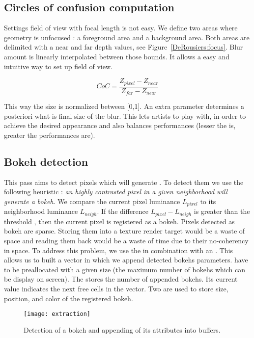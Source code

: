 \subsection{Circles of confusion computation}
Settings field of view with focal length is not easy.
We define two areas where geometry is unfocused : a foreground area and a background area. Both areas are delimited with a near and far depth values, see Figure~\ref{DeRousiers:focus}. Blur amount is linearly interpolated between those bounds. It allows a easy and intuitive way to set up field of view.

$$
	CoC = \frac{Z_{pixel} - Z_{near} }{ Z_{far} - Z_{near} }
$$

This way the \coc size is normalized between [0,1]. An extra parameter  determines a posteriori what is final size of the blur. This lets artists to play with, in order to achieve the desired appearance and also balances performances (lesser the  is, greater the performances are).


\subsection{Bokeh detection}
This pass aims to detect pixels which will generate \bokehs. To detect them we use the following heuristic : \emph{an highly contrasted pixel in a given neighborhood will generate a bokeh}. We compare the current pixel luminance $L_{pixel}$ to its neighborhood luminance $L_{neigh}$. If the difference $L_{pixel}-L_{neigh}$ is greater than the threshold , then the current pixel is registered as a bokeh. Pixels detected as bokeh are sparse. Storing them into a texture render target would be a waste of space and reading them back would be a waste of time due to their no-coherency in space. To address this problem, we use the \opengl {} in combination with an . This allows us to built a vector in which we append detected bokehs parameters.  have to be preallocated with a given size (\ie the maximum number of bokehs which can be display on screen). The  stores the number of appended bokehs. Its current value indicates the next free cells in the  vector. Two  are used to store \coc size, position, and color of the registered bokeh. 

	\begin{figure}[htb]\centering
	\texttt{[image: extraction]}
	\caption{Detection of a bokeh and appending of its attributes into buffers.}
	\label{YourName:fig1}
	\end{figure}

